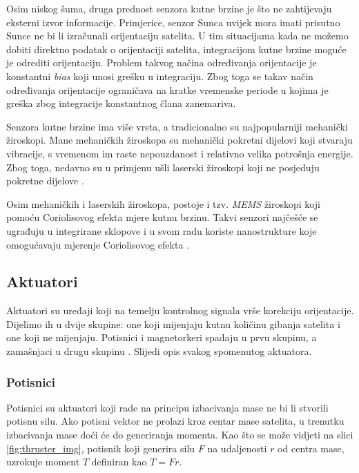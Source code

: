 \documentclass[times, utf8, diplomski, numeric]{templates/template}
\begin{document}
{{{            Osim niskog šuma, druga prednost senzora kutne brzine je što ne zahtijevaju eksterni izvor informacije. Primjerice, senzor Sunca uvijek mora imati prisutno Sunce ne bi li izračunali orijentaciju satelita. U tim situacijama kada ne možemo dobiti direktno podatak o orijentaciji satelita, integracijom kutne brzine moguće je odrediti orijentaciju. Problem takvog načina određivanja orijentacije je konstantni \emph{bias} koji unosi grešku u integraciju. Zbog toga se takav način određivanja orijentacije ograničava na kratke vremenske periode u kojima je greška zbog integracije konstantnog člana zanemariva.

            Senzora kutne brzine ima više vrsta, a tradicionalno su najpopularniji mehanički žiroskopi. Mane mehaničkih žiroskopa su mehanički pokretni dijelovi koji stvaraju vibracije, s vremenom im raste nepouzdanost i relativno velika potrošnja energije. Zbog toga, nedavno su u primjenu ušli laserski žiroskopi koji ne posjeduju pokretne dijelove \cite{adcsKnjiga}. 

            Osim mehaničkih i laserskih žiroskopa, postoje i tzv. \emph{MEMS} žiroskopi koji pomoću Coriolisovog efekta mjere kutnu brzinu. Takvi senzori najčešće se ugrađuju u integrirane sklopove i u svom radu koriste nanostrukture koje omogućavaju mjerenje Coriolisovog efekta \cite{memsGyro}.
        }

        \subsection{Aktuatori}{
            Aktuatori su uređaji koji na temelju kontrolnog signala vrše korekciju orijentacije. Dijelimo ih u dvije skupine: one koji mijenjaju kutnu količinu gibanja satelita i one koji ne mijenjaju. Potisnici i magnetorkeri spadaju u prvu skupinu, a zamašnjaci u drugu skupinu \cite{adcsKnjiga}. Slijedi opis svakog spomenutog aktuatora. 

            \subsubsection{Potisnici }{
                Potisnici su aktuatori koji rade na principu izbacivanja mase ne bi li stvorili potisnu silu. Ako potisni vektor ne prolazi kroz centar mase satelita, u trenutku izbacivanja mase doći će do generiranja momenta. Kao što se može vidjeti na slici \ref{fig:thruster_img}, potisnik koji generira silu $F$ na udaljenosti $r$ od centra mase, uzrokuje moment $T$ definiran kao $T=Fr$.

}}}}
\end{document}
